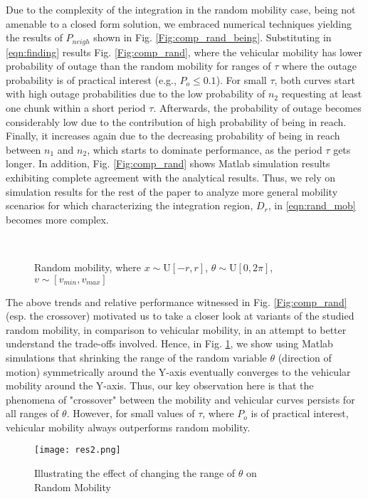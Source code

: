 \documentclass[conference,a4paper]{IEEEtran}
\begin{document}
Due to the complexity of the integration in the random mobility case, being not amenable to a closed form solution, we embraced numerical techniques yielding the results of $P_{neigh}$ shown in Fig. \ref{Fig:comp_rand_being}. Substituting in \eqref{eqn:finding} results Fig. \ref{Fig:comp_rand}, where the vehicular mobility has lower probability of outage than the random mobility for ranges of $\tau$ where the outage probability is of practical interest (e.g., $P_o \le 0.1$). For small $\tau$, both curves start with high outage probabilities due to the low probability of $n_2$ requesting at least one chunk within a short period $\tau$. Afterwards, the probability of outage becomes considerably low due to the contribution of high probability of being in reach. Finally, it increases again due to the decreasing probability of being in reach between $n_1$ and $n_2$, which starts to dominate performance, as the period $\tau$ gets longer. In addition, Fig. \ref{Fig:comp_rand} shows Matlab simulation results exhibiting complete agreement with the analytical results. Thus, we rely on simulation results for the rest of the paper to analyze more general mobility scenarios for which characterizing the integration region, $D_r$, in \eqref{eqn:rand_mob} becomes more complex.
\begin{figure}[!t]
\centering
{}\\
\caption{Random mobility, where $x\sim\mathrm{U}[-r,r]$, $\theta\sim\mathrm{U}[0,2\pi]$, $v\sim[v_{min}, v_{max}]$}
\setlength{\abovecaptionskip}{-10pt}
\setlength{\belowcaptionskip}{-15pt}
\end{figure}
The above trends and relative performance witnessed in Fig. \ref{Fig:comp_rand} (esp. the crossover) motivated us to take a closer look at variants of the studied random mobility, in comparison to vehicular mobility, in an attempt to better understand the trade-offs involved. Hence, in Fig. \ref{Fig:comp_rand_around_y}, we show using Matlab simulations that shrinking the range of the random variable $\theta$ (direction of motion) symmetrically around the Y-axis eventually converges to the vehicular mobility around the Y-axis. Thus, our key observation here is that the phenomena of "crossover" between the mobility and vehicular curves persists for all ranges of $\theta$. However, for small values of $\tau$, where $P_o$ is of practical interest, vehicular mobility always outperforms random mobility.
\begin{figure}[!t]
\centering
\advance{}
\texttt{[image: res2.png]}
\setlength{\abovecaptionskip}{-10pt}
\setlength{\belowcaptionskip}{-15pt}
\caption{Illustrating the effect of changing the range of $\theta$ on \\ Random Mobility}
\label{Fig:comp_rand_around_y}
\end{figure}
\end{document}
